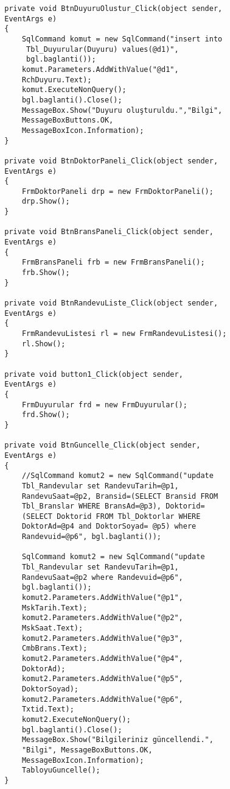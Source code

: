 \begin{lstlisting}
        private void BtnDuyuruOlustur_Click(object sender, 
        EventArgs e)
        {
            SqlCommand komut = new SqlCommand("insert into
             Tbl_Duyurular(Duyuru) values(@d1)", 
             bgl.baglanti());
            komut.Parameters.AddWithValue("@d1", 
            RchDuyuru.Text);
            komut.ExecuteNonQuery();
            bgl.baglanti().Close();
            MessageBox.Show("Duyuru oluşturuldu.","Bilgi",
            MessageBoxButtons.OK,
            MessageBoxIcon.Information);
        }

        private void BtnDoktorPaneli_Click(object sender, 
        EventArgs e)
        {
            FrmDoktorPaneli drp = new FrmDoktorPaneli();
            drp.Show();
        }

        private void BtnBransPaneli_Click(object sender, 
        EventArgs e)
        {
            FrmBransPaneli frb = new FrmBransPaneli();
            frb.Show();
        }

        private void BtnRandevuListe_Click(object sender, 
        EventArgs e)
        {
            FrmRandevuListesi rl = new FrmRandevuListesi();
            rl.Show();
        }

        private void button1_Click(object sender, 
        EventArgs e)
        {
            FrmDuyurular frd = new FrmDuyurular();
            frd.Show();
        }

        private void BtnGuncelle_Click(object sender, 
        EventArgs e)
        {
            //SqlCommand komut2 = new SqlCommand("update 
            Tbl_Randevular set RandevuTarih=@p1, 
            RandevuSaat=@p2, Bransid=(SELECT Bransid FROM 
            Tbl_Branslar WHERE BransAd=@p3), Doktorid=
            (SELECT Doktorid FROM Tbl_Doktorlar WHERE 
            DoktorAd=@p4 and DoktorSoyad= @p5) where 
            Randevuid=@p6", bgl.baglanti());

            SqlCommand komut2 = new SqlCommand("update 
            Tbl_Randevular set RandevuTarih=@p1, 
            RandevuSaat=@p2 where Randevuid=@p6", 
            bgl.baglanti());
            komut2.Parameters.AddWithValue("@p1", 
            MskTarih.Text);
            komut2.Parameters.AddWithValue("@p2", 
            MskSaat.Text);
            komut2.Parameters.AddWithValue("@p3", 
            CmbBrans.Text);
            komut2.Parameters.AddWithValue("@p4", 
            DoktorAd);
            komut2.Parameters.AddWithValue("@p5", 
            DoktorSoyad);
            komut2.Parameters.AddWithValue("@p6", 
            Txtid.Text);
            komut2.ExecuteNonQuery();
            bgl.baglanti().Close();
            MessageBox.Show("Bilgileriniz güncellendi.", 
            "Bilgi", MessageBoxButtons.OK, 
            MessageBoxIcon.Information);
            TabloyuGuncelle();
        }


\end{lstlisting}
